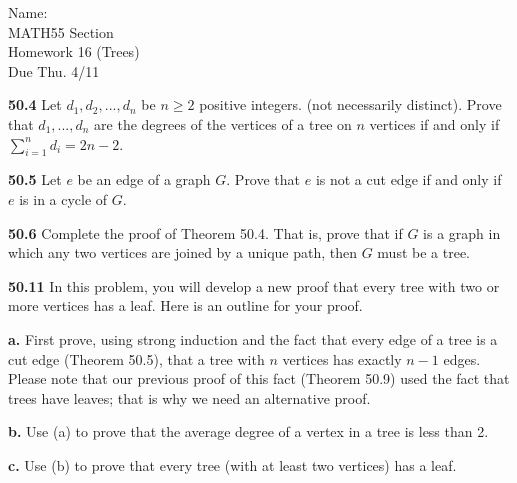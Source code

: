 \documentclass[10pt]{article}
\begin{document}
\begin{flushright}
	Name: \underline{\hspace{3cm}} \\
	MATH55 Section \underline{\hspace{0.5cm}} \\
	Homework 16 (Trees)\\
	Due Thu. 4/11
\end{flushright}


\begin{framed}
	\textbf{50.4} Let $d_1, d_2,...,d_n$ be $n \geq 2$ positive integers.
	(not necessarily distinct). Prove that $d_1,...,d_n$ are the degrees of
	the vertices of a tree on $n$ vertices if and only if $\sum_{i=1}^{n}d_i = 2n-2$.
\end{framed}

\pagebreak

\begin{framed}
	\textbf{50.5} Let $e$ be an edge of a graph $G$. Prove that $e$ is not a cut
	edge if and only if $e$ is in a cycle of $G$.
\end{framed}

\pagebreak

\begin{framed}
	\textbf{50.6} Complete the proof of Theorem 50.4. That is, prove that 
	if $G$ is a graph in which any two vertices are joined by a unique path, then 
	$G$ must be a tree.
\end{framed}

\pagebreak

\begin{framed}
	\textbf{50.11} In this problem, you will develop a new proof that every tree 
	with two or more vertices has a leaf. Here is an outline for your proof.

	\textbf{a.} First prove, using strong induction and the fact that every edge of a tree
	is a cut edge (Theorem 50.5), that a tree with $n$ vertices has exactly $n - 1$ edges.
	Please note that our previous proof of this fact (Theorem 50.9) used the fact that trees have leaves;
	that is why we need an alternative proof.
	
	\textbf{b.} Use (a) to prove that the average degree of a vertex in a tree is less than 2.
	
	\textbf{c.} Use (b) to prove that every tree (with at least two vertices) has a leaf.
\end{framed}
\end{document}
